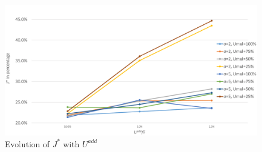 \begin{figure}
	\label{fig:uadd}
	\caption{Evolution of $J^{*}$ with $U^{add}$}
	\includegraphics[width=7in]{figures/uadd.png}
\end{figure}